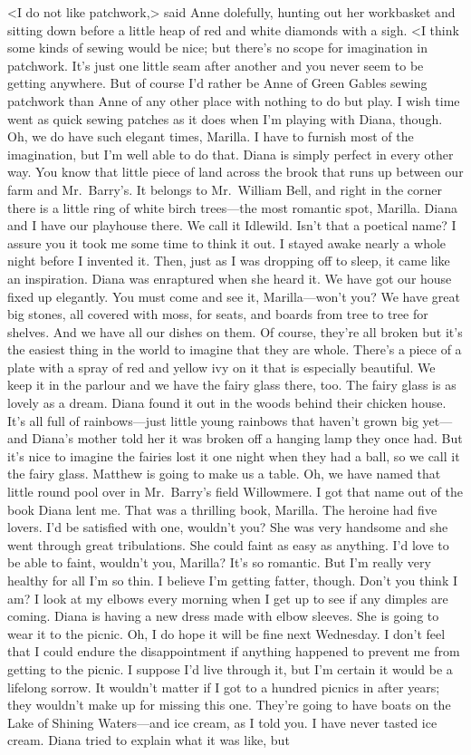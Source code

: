 <I do not like patchwork,> said Anne dolefully, hunting out her workbasket and sitting down before a little heap of red and white diamonds with a sigh. <I think some kinds of sewing would be nice; but there's no scope for imagination in patchwork. It's just one little seam after another and you never seem to be getting anywhere. But of course I'd rather be Anne of Green Gables sewing patchwork than Anne of any other place with nothing to do but play. I wish time went as quick sewing patches as it does when I'm playing with Diana, though. Oh, we do have such elegant times, Marilla. I have to furnish most of the imagination, but I'm well able to do that. Diana is simply perfect in every other way. You know that little piece of land across the brook that runs up between our farm and Mr.~Barry's. It belongs to Mr.~William Bell, and right in the corner there is a little ring of white birch trees—the most romantic spot, Marilla. Diana and I have our playhouse there. We call it Idlewild. Isn't that a poetical name? I assure you it took me some time to think it out. I stayed awake nearly a whole night before I invented it. Then, just as I was dropping off to sleep, it came like an inspiration. Diana was enraptured when she heard it. We have got our house fixed up elegantly. You must come and see it, Marilla—won't you? We have great big stones, all covered with moss, for seats, and boards from tree to tree for shelves. And we have all our dishes on them. Of course, they're all broken but it's the easiest thing in the world to imagine that they are whole. There's a piece of a plate with a spray of red and yellow ivy on it that is especially beautiful. We keep it in the parlour and we have the fairy glass there, too. The fairy glass is as lovely as a dream. Diana found it out in the woods behind their chicken house. It's all full of rainbows—just little young rainbows that haven't grown big yet—and Diana's mother told her it was broken off a hanging lamp they once had. But it's nice to imagine the fairies lost it one night when they had a ball, so we call it the fairy glass. Matthew is going to make us a table. Oh, we have named that little round pool over in Mr.~Barry's field Willowmere. I got that name out of the book Diana lent me. That was a thrilling book, Marilla. The heroine had five lovers. I'd be satisfied with one, wouldn't you? She was very handsome and she went through great tribulations. She could faint as easy as anything. I'd love to be able to faint, wouldn't you, Marilla? It's so romantic. But I'm really very healthy for all I'm so thin. I believe I'm getting fatter, though. Don't you think I am? I look at my elbows every morning when I get up to see if any dimples are coming. Diana is having a new dress made with elbow sleeves. She is going to wear it to the picnic. Oh, I do hope it will be fine next Wednesday. I don't feel that I could endure the disappointment if anything happened to prevent me from getting to the picnic. I suppose I'd live through it, but I'm certain it would be a lifelong sorrow. It wouldn't matter if I got to a hundred picnics in after years; they wouldn't make up for missing this one. They're going to have boats on the Lake of Shining Waters—and ice cream, as I told you. I have never tasted ice cream. Diana tried to explain what it was like, but 